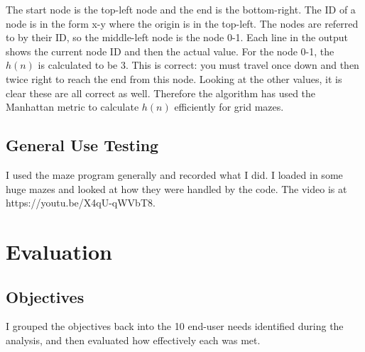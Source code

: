 \documentclass[titlepage]{article}
\begin{document}
The start node is the top-left node and the end is the bottom-right. The ID of a node is in the form x-y where the origin is in the top-left. The nodes are referred to by their ID, so the middle-left node is the node 0-1. Each line in the output shows the current node ID and then the actual value. For the node 0-1, the $h(n)$ is calculated to be 3. This is correct: you must travel once down and then twice right to reach the end from this node. Looking at the other values, it is clear these are all correct as well. Therefore the algorithm has used the Manhattan metric to calculate $h(n)$ efficiently for grid mazes.

\subsection{General Use Testing}
I used the maze program generally and recorded what I did. I loaded in some huge mazes and looked at how they were handled by the code. The video is at https://youtu.be/X4qU-qWVbT8.
\pagebreak

\section{Evaluation}
\subsection{Objectives}
I grouped the objectives back into the 10 end-user needs identified during the analysis, and then evaluated how effectively each was met.
\end{document}

